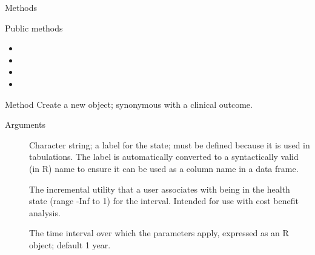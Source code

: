 \documentclass[a4paper]{book}
\begin{document}
\begin{Section}{Methods}
%
\begin{SubSection}{Public methods}
\begin{itemize}

\item{} 
\item{} 
\item{} 
\item{} 

\end{itemize}

\end{SubSection}




\hypertarget{method-new}{}
%
\begin{SubSection}{Method }
Create a new  object; synonymous with a clinical outcome.
%


%
\begin{SubSubSection}{Arguments}

\begin{description}

\item[] Character string; a label for the state; must be
defined because it is used in tabulations. The label is automatically converted
to a syntactically valid (in R) name to ensure it can be used as a column
name in a data frame.

\item[] The incremental utility that a user associates with
being in the health state (range -Inf to 1) for the interval. Intended
for use with cost benefit analysis.

\item[] The time interval over which the  parameters
apply, expressed as an R  object; default 1 year.

\end{description}



\end{SubSubSection}
\end{SubSection}
\end{Section}
\end{document}
